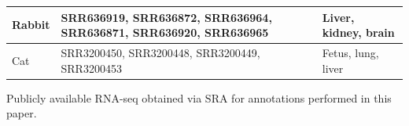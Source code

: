\documentclass[fleqn,10pt]{wlscirep}
\begin{document}
\begin{center}
\begin{longtable}{|p{}|p{}|p{}|}
Rabbit    & SRR636919, SRR636872, SRR636964, SRR636871, SRR636920, SRR636965                                                                                                                                                                                                                                                                                                                                                                               &          Liver, kidney, brain                                                                                                             \\ \hline
Cat       & SRR3200450, SRR3200448, SRR3200449, SRR3200453                                                                                                                                                                                                                                                                                                                                                                                                 &      Fetus, lung, liver                                                        \\ \hline                           
\end{longtable}
Publicly available RNA-seq obtained via SRA for annotations performed in this paper. 
\label{table:tables1}
\end{center}
\end{document}
